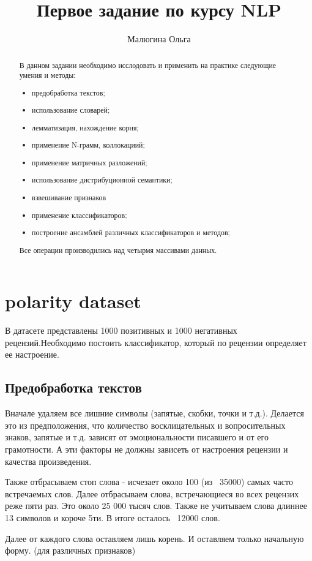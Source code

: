 \documentclass[]{report}
\title{Первое задание по курсу NLP}
\author{Малюгина Ольга}
\begin{document}
\maketitle

\begin{abstract}
	В данном задании необходимо исслодовать и применить на практике следующие умения и методы:
	\begin{itemize}
		\item предобработка текстов;
		\item использование словарей;
		\item лемматизация, нахождение корня;
		\item применение N-грамм, коллокациий;
		\item применение матричных разложений;
		\item использование дистрибуционной семантики;
		\item взвешивание признаков
		\item применение классификаторов;
		\item построение ансамблей различных классификаторов и методов;		
	\end{itemize}
	Все операции производились над четырмя массивами данных.
\end{abstract}

\section{polarity dataset}
В датасете представлены 1000 позитивных и 1000 негативных рецензий.Необходимо постоить классификатор, который по рецензии определяет ее настроение.
\subsection{Предобработка текстов}
Вначале удаляем все лишние символы (запятые, скобки, точки и т.д.).
Делается это из предположения, что количество восклицательных и вопросительных знаков, запятые и т.д. зависят от эмоциональности писавшего и от его грамотности. А эти факторы не должны зависеть от настроения рецензии и качества произведения.

Также отбрасываем стоп слова - исчезает около 100 (из ~35000) самых часто встречаемых слов.
Далее отбрасываем слова, встречающиеся во всех рецензих реже пяти раз. Это около 25 000 тысяч слов.
Также не учитываем слова длиннее 13 символов и короче 5ти. В итоге осталось ~12000 слов.

Далее от каждого слова оставляем лишь корень. И оставляем только начальную форму. (для различных признаков)
\end{document}
